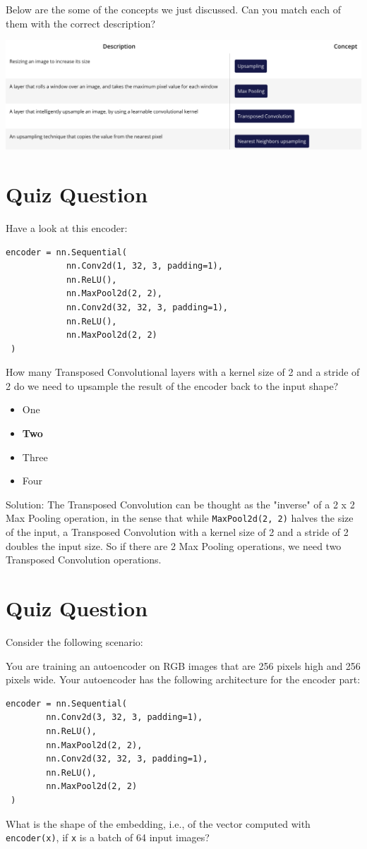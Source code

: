 Below are the some of the concepts we just discussed. Can you match each of them with the correct description?

\includegraphics[width=0.75\linewidth]{img//cnn//autoencoders/quiz1.png}


\section{Quiz Question}

Have a look at this encoder:
\begin{lstlisting}
encoder = nn.Sequential(
            nn.Conv2d(1, 32, 3, padding=1),
            nn.ReLU(),
            nn.MaxPool2d(2, 2),
            nn.Conv2d(32, 32, 3, padding=1),
            nn.ReLU(),
            nn.MaxPool2d(2, 2)
 )
\end{lstlisting}
How many Transposed Convolutional layers with a kernel size of 2 and a stride of 2 do we need to upsample the result of the encoder back to the input shape?
\begin{itemize}
    \item One
    \item \textbf{Two}
    \item Three
    \item Four
\end{itemize}
Solution: The Transposed Convolution can be thought as the "inverse" of a 2 x 2 Max Pooling operation, in the sense that while \verb|MaxPool2d(2, 2)| halves the size of the input, a Transposed Convolution with a kernel size of 2 and a stride of 2 doubles the input size. So if there are 2 Max Pooling operations, we need two Transposed Convolution operations.

\section{Quiz Question}

Consider the following scenario:

You are training an autoencoder on RGB images that are 256 pixels high and 256 pixels wide. Your autoencoder has the following architecture for the encoder part:
\begin{lstlisting}
encoder = nn.Sequential(
        nn.Conv2d(3, 32, 3, padding=1),
        nn.ReLU(),
        nn.MaxPool2d(2, 2),
        nn.Conv2d(32, 32, 3, padding=1),
        nn.ReLU(),
        nn.MaxPool2d(2, 2)
 )
\end{lstlisting}
What is the shape of the embedding, i.e., of the vector computed with \verb|encoder(x)|, if \verb|x| is a batch of 64 input images?

